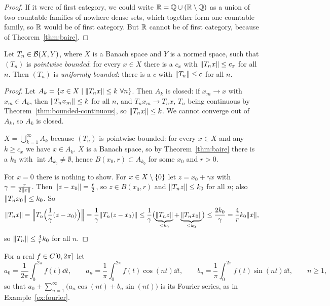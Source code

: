 \begin{proof}
If it were of first category, we could write $\mathbb{R} = \mathbb{Q} \cup (\mathbb{R} \setminus \mathbb{Q})$
as a union of two countable families of nowhere dense sets, which together
form one countable family, so $\mathbb{R}$ would be of first category. But $\mathbb{R}$
cannot be of first category, because of Theorem~\ref{thm:baire}.
\end{proof}

\begin{theorem}\label{thm:ubp}
Let $T_n \in \mathcal{B}(X, Y)$, where $X$ is a Banach space and $Y$ is a normed
space, such that $(T_n)$ is \emph{pointwise bounded}: for every $x \in X$
there is a $c_x$ with $\lVert T_n x\rVert \le c_x$ for all $n$. Then $(T_n)$ is
\emph{uniformly bounded}: there is a $c$ with $\lVert T_n\rVert \le c$ for all
$n$.
\end{theorem}

\begin{proof}
Let $A_k = \{x \in X \mid \lVert T_n x\rVert \le k \ \forall n\}$. Then $A_k$ is
closed: if $x_m \to x$ with $x_m \in A_k$, then $\lVert T_n x_m\rVert \le k$ for
all $n$, and $T_n x_m \to T_n x$, $T_n$ being continuous by
Theorem~\ref{thm:bounded-continuous}, so $\lVert T_n x\rVert \le k$. We cannot
converge out of $A_k$, so $A_k$ is closed.

$X = \bigcup_{k=1}^{\infty} A_k$ because $(T_n)$ is pointwise bounded: for
every $x \in X$ and any $k \ge c_x$ we have $x \in A_k$. $X$ is a Banach
space, so by Theorem~\ref{thm:baire} there is a $k_0$ with
$\operatorname{int} A_{k_0} \ne \emptyset$, hence
$B(x_0, r) \subset A_{k_0}$ for some $x_0$ and $r > 0$.

For $x = 0$ there is nothing to show. For $x \in X \setminus \{0\}$ let
$z = x_0 + \gamma x$ with $\gamma = \frac{r}{2\lVert x\rVert}$. Then
$\lVert z - x_0\rVert = \frac{r}{2}$, so $z \in B(x_0, r)$ and
$\lVert T_n z\rVert \le k_0$ for all $n$; also $\lVert T_n x_0\rVert \le k_0$. So
\[
  \lVert T_n x\rVert = \Bigl\lVert T_n\Bigl(\frac{1}{\gamma}(z - x_0)\Bigr)
  \Bigr\rVert = \frac{1}{\gamma}\lVert T_n(z - x_0)\rVert
  \le \frac{1}{\gamma}\bigl(\underbrace{\lVert T_n z\rVert}_{\le k_0}
    + \underbrace{\lVert T_n x_0\rVert}_{\le k_0}\bigr)
  \le \frac{2k_0}{\gamma} = \frac{4}{r} k_0 \lVert x\rVert ,
\]
so $\lVert T_n\rVert \le \frac{4}{r} k_0$ for all $n$.
\end{proof}

For a real $f \in C[0,2\pi]$ let
\[
  a_0 = \frac{1}{2\pi}\int_0^{2\pi} f(t) \dd t , \qquad
  a_n = \frac{1}{\pi}\int_0^{2\pi} f(t) \cos(nt) \dd t , \qquad
  b_n = \frac{1}{\pi}\int_0^{2\pi} f(t) \sin(nt) \dd t , \qquad n \ge 1 ,
\]
so that $a_0 + \sum_{n=1}^{\infty} \bigl(a_n \cos(nt) + b_n \sin(nt)\bigr)$
is its Fourier series, as in Example~\ref{ex:fourier}.

